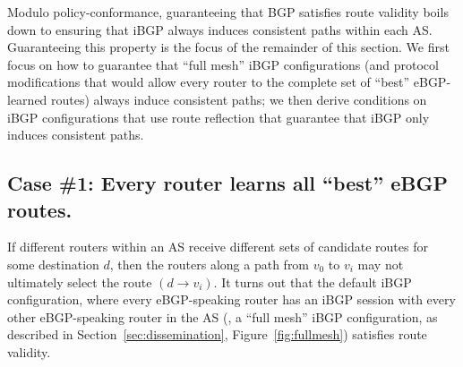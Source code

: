 

Modulo policy-conformance, guaranteeing that BGP satisfies route
validity boils down to ensuring that iBGP always induces consistent
paths within each AS.  Guaranteeing this property is the focus of
the remainder of this section.  We first focus on how to guarantee that
``full mesh'' iBGP configurations (and protocol modifications that
would allow every
router to the complete set of ``best'' eBGP-learned routes) always
induce consistent paths; we 
then derive conditions on iBGP configurations that use route reflection
that guarantee that iBGP only induces consistent paths.

\subsection{Case \#1: Every router learns all ``best'' eBGP routes.}
\label{sec:mesh}

If different routers within an AS receive different sets of candidate
routes for some destination $d$, then the routers along a path from $v_0$
to $v_i$ may not ultimately select the route $(d \rightarrow v_i)$.  It
turns out that the default iBGP configuration, where every eBGP-speaking
router has an iBGP session with every other eBGP-speaking router in the
AS (\ie, a ``full mesh'' iBGP configuration, as described in
Section~\ref{sec:dissemination}, Figure~\ref{fig:fullmesh}) satisfies
route validity.

